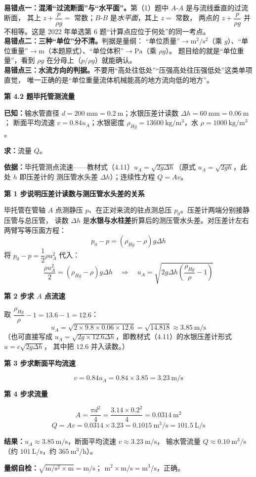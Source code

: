 \begin{yicuo}
\textbf{易错点一：混淆“过流断面”与“水平面”。}第（1）题中 $A$-$A$ 是与流线垂直的过流断面，
其上 $z+\dfrac{p}{\rho g}=$ 常数；$B$-$B$ 是\emph{水平面}，其上 $z=$ 常数，
两点的 $z+\dfrac{p}{\rho g}$ 并不相等。这是 2022 年单选第 6 题“计算点应位于何处”的同一考点。\\
\textbf{易错点二：三种“单位”分不清。}判据是量纲：
“单位质量”$\to\mathrm{m^2/s^2}$（乘 $g$）、“单位重量”$\to\mathrm{m}$（本题原式）、“单位体积”$\to\mathrm{Pa}$（乘 $\rho g$）。
题目给的就是“单位重量”，看到 $\rho g$ 在分母上（$p/\rho g$）就能确认。\\
\textbf{易错点三：水流方向的判据。}不要用“高处往低处”“压强高处往压强低处”这类单项直觉，
唯一正确的是“单位重量流体机械能高的地方流向低的地方”。
\end{yicuo}

\noindent\textbf{第 4.2 题\quad 毕托管测流量}

\begin{jie}
\textbf{已知：}输水管直径 $d=200\ \mathrm{mm}=0.2\ \mathrm{m}$；水银压差计读数 $\Delta h=60\ \mathrm{mm}=0.06\ \mathrm{m}$；
断面平均流速 $v=0.84u_A$；水银密度 $\rho_{Hg}=13600\ \mathrm{kg/m^3}$，水 $\rho=1000\ \mathrm{kg/m^3}$。

\textbf{求：}流量 $Q$。

\textbf{依据：}毕托管测点流速——教材式（4.11）$u_A=\sqrt{2g\Delta h}$（原式 $u_A=\sqrt{2gh}$，此处 $h$ 即压差计的
测压管水头差 $\Delta h$）；连续性方程 $Q=Av$。

\textbf{第 1 步\quad 说明压差计读数与测压管水头差的关系}

毕托管在管轴 $A$ 点测静压 $p$、在正对来流的驻点测总压 $p_0$。压差计两端分别接静压管与总压管，
读数 $\Delta h$ 是\textbf{水银与水柱差}折算后的测压管水头差。对压差计左右两臂写等压面方程：
\[ p_0-p=\left(\rho_{Hg}-\rho\right)g\Delta h \]
将 $p_0-p=\dfrac{1}{2}\rho u_A^2$ 代入：
\[ \frac{\rho u_A^2}{2}=\left(\rho_{Hg}-\rho\right)g\Delta h
   \quad\Longrightarrow\quad
   u_A=\sqrt{2g\Delta h\left(\frac{\rho_{Hg}}{\rho}-1\right)} \]

\textbf{第 2 步\quad 求 $A$ 点流速}

取 $\dfrac{\rho_{Hg}}{\rho}-1=13.6-1=12.6$：
\[ u_A=\sqrt{2\times9.8\times0.06\times12.6}=\sqrt{14.818}\approx3.85\ \mathrm{m/s} \]
（也可直接写成 $u_A=\sqrt{2g\times12.6\Delta h}$，即教材式（4.11）的水银压差计形式 $u=c\sqrt{2g\Delta h}$，
其中把 $12.6$ 并入读数。）

\textbf{第 3 步\quad 求断面平均流速}

\[ v=0.84u_A=0.84\times3.85=3.23\ \mathrm{m/s} \]

\textbf{第 4 步\quad 求流量}

\[ A=\frac{\pi d^2}{4}=\frac{3.14\times0.2^2}{4}=0.0314\ \mathrm{m^2} \]
\[ Q=Av=0.0314\times3.23=0.1015\ \mathrm{m^3/s}=101.5\ \mathrm{L/s} \]

\textbf{结果：}$u_A\approx3.85\ \mathrm{m/s}$，断面平均流速 $v\approx3.23\ \mathrm{m/s}$，
输水管流量 $Q\approx0.10\ \mathrm{m^3/s}$（约 $101\ \mathrm{L/s}$，约 $365\ \mathrm{m^3/h}$）。

\textbf{量纲自检：}$\sqrt{\mathrm{m/s^2\times m}}=\mathrm{m/s}$；
$\mathrm{m^2\times m/s}=\mathrm{m^3/s}$，正确。
\end{jie}


